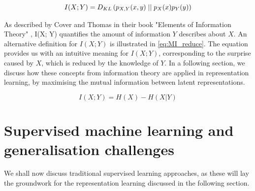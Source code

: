 \begin{equation}
	I(X; Y) =  D_{KL} \left( p_{X, Y}(x, y) \mid \mid p_X(x) p_Y(y) \right)
\end{equation}

As described by Cover and Thomas in their book "Elements of Information Theory" \cite{coverELEMENTSINFORMATIONTHEORY}, I(X; Y) quantifies the amount of information $Y$ describes about $X$. An alternative definition for $I(X;Y)$ is illustrated in \ref{eq:MI_reduce}. The equation provides us with an intuitive meaning for $I(X;Y)$, corresponding to the surprise caused by $X$, which is reduced by the knowledge of $Y$. In a following section, we discuss how these concepts from information theory are applied in representation learning, by maximising the mutual information between latent representations.

\begin{equation}
	I(X;Y)= H(X) - H(X|Y) \label{eq:MI_reduce}
\end{equation}



\section{Supervised machine learning and generalisation challenges}




We shall now discuss traditional supervised learning approaches, as these will lay the groundwork for the representation learning discussed in the following section. 

